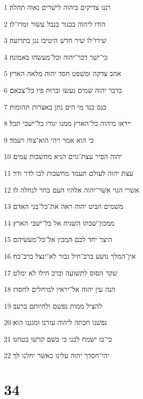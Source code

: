 \par 1 רננו צדיקים ביהוה לישׁרים נאוה תהלה׃
\par 2 הודו ליהוה בכנור בנבל עשׂור זמרו־לו׃
\par 3 שׁירו־לו שׁיר חדשׁ היטיבו נגן בתרועה׃
\par 4 כי־ישׁר דבר־יהוה וכל־מעשׂהו באמונה׃
\par 5 אהב צדקה ומשׁפט חסד יהוה מלאה הארץ׃
\par 6 בדבר יהוה שׁמים נעשׂו וברוח פיו כל־צבאם׃
\par 7 כנס כנד מי הים נתן באצרות תהומות׃
\par 8 ייראו מיהוה כל־הארץ ממנו יגורו כל־ישׁבי תבל׃
\par 9 כי הוא אמר ויהי הוא־צוה ויעמד׃
\par 10 יהוה הפיר עצת־גוים הניא מחשׁבות עמים׃
\par 11 עצת יהוה לעולם תעמד מחשׁבות לבו לדר ודר׃
\par 12 אשׁרי הגוי אשׁר־יהוה אלהיו העם בחר לנחלה לו׃
\par 13 משׁמים הביט יהוה ראה את־כל־בני האדם׃
\par 14 ממכון־שׁבתו השׁגיח אל כל־ישׁבי הארץ׃
\par 15 היצר יחד לבם המבין אל־כל־מעשׂיהם׃
\par 16 אין־המלך נושׁע ברב־חיל גבור לא־ינצל ברב־כח׃
\par 17 שׁקר הסוס לתשׁועה וברב חילו לא ימלט׃
\par 18 הנה עין יהוה אל־יראיו למיחלים לחסדו׃
\par 19 להציל ממות נפשׁם ולחיותם ברעב׃
\par 20 נפשׁנו חכתה ליהוה עזרנו ומגננו הוא׃
\par 21 כי־בו ישׂמח לבנו כי בשׁם קדשׁו בטחנו׃
\par 22 יהי־חסדך יהוה עלינו כאשׁר יחלנו לך׃

\chapter{34}

